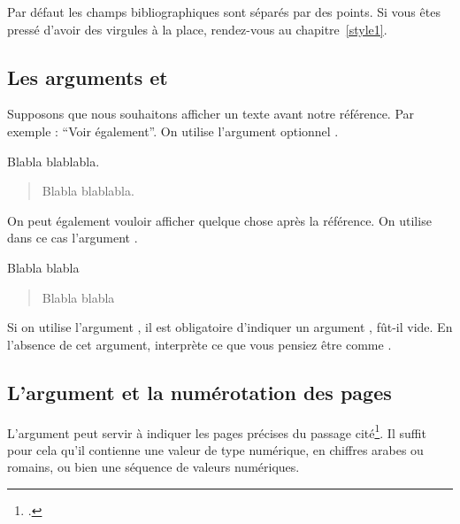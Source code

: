 \begin{plusloins}
Par défaut les champs bibliographiques sont séparés par des points. Si vous êtes pressé d'avoir des virgules à la place, rendez-vous au chapitre~\ref{style1}.
\end{plusloins}

\subsection{Les arguments  et }

Supposons que nous souhaitons afficher un texte avant notre référence. Par exemple : \enquote{Voir également}. On utilise l'argument optionnel .

\begin{latexcode}
Blabla \autocite[Voir également][]{Saxer1980} blablabla.
\end{latexcode}

\begin{quotation}
Blabla \cite[Voir également][]{Saxer1980} blablabla.
\end{quotation}



On peut également vouloir afficher quelque chose après la référence. On utilise dans ce cas l'argument .

\begin{latexcode}
Blabla \autocite[Voir également][qui porte sur un
sujet similaire.]{Saxer1980} blabla
\end{latexcode}

\begin{quotation}
Blabla \cite[Voir également][qui porte sur un sujet similaire.]{Saxer1980} blabla
\end{quotation}

\begin{attention}
Si on utilise l'argument , il est obligatoire d'indiquer un argument , fût-il vide. En l'absence de cet argument,  interprète  ce que vous pensiez être  comme .
\end{attention}

\subsection{L'argument  et la numérotation des pages}\label{pagespostnote}

L'argument  peut servir à indiquer les pages précises du passage cité\footcite[On consultera pour plus de détails : ][]{biblatex_pages}. Il suffit pour cela qu'il contienne une valeur de type numérique, en chiffres arabes ou romains, ou bien une séquence de valeurs numériques.

